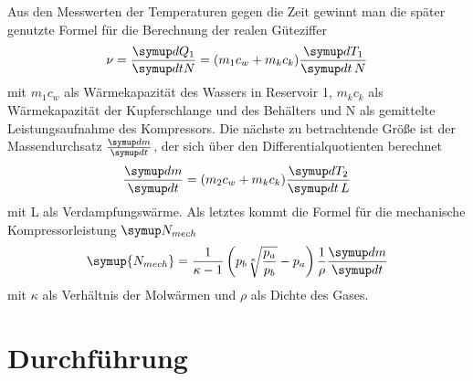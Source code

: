Aus den Messwerten der Temperaturen gegen die Zeit gewinnt man die später genutzte Formel
für die Berechnung der realen Güteziffer
\begin{equation}
    \nu = \frac{\symup dQ_1}{\symup dt N} = (m_1c_w + m_kc_k) \frac{\symup dT_1}{\symup dt \, N}
    \label{eqn:8}
\end{equation}
mit $m_1c_w$ als Wärmekapazität des Wassers in Reservoir 1, $m_kc_k$ als Wärmekapazität
der Kupferschlange und des Behälters und N als gemittelte Leistungsaufnahme des Kompressors.
Die nächste zu betrachtende Größe ist der Massendurchsatz $\frac{\symup dm}{\symup dt}$, der
sich über den Differentialquotienten berechnet
\begin{equation}
      \frac{\symup dm}{\symup dt} = (m_2 c_w + m_k c_k) \frac{\symup dT_2}{\symup dt \, L}
      \label{eqn:9}
\end{equation}
mit L als Verdampfungswärme.
Als letztes kommt die Formel für die mechanische Kompressorleistung $\symup N_{mech}$
\begin{equation}
    \symup{N_{mech}} = \frac{1}{\kappa - 1} \left(p_b\sqrt[\kappa]{\frac{p_a}{p_b}} - p_a \right) \frac{1}{\rho}
    \frac{\symup dm}{\symup dt}
    \label{eqn:10}
\end{equation}
mit $\kappa$ als Verhältnis der Molwärmen und $\rho$ als Dichte des Gases.
\section{Durchführung}
